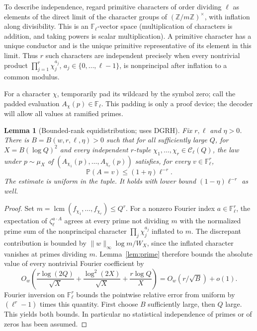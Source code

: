 \documentclass[11pt]{article}
\newtheorem{lemma}[theorem]{Lemma}
\theoremstyle{remark}\newtheorem{remark}[theorem]{Remark}
\newcommand{\F}{\mathbb F}
\newcommand{\Pp}{\mathbb P}
\newcommand{\C}{\mathcal C}
\begin{document}
To describe independence, regard primitive characters of order dividing $\ell$ as elements of the direct limit of the character groups of $(\mathbb Z/m\mathbb Z)^\times$, with inflation along divisibility. This is an $\F_\ell$-vector space (multiplication of characters is addition, and taking powers is scalar multiplication). A primitive character has a unique conductor and is the unique primitive representative of its element in this limit. Thus $r$ such characters are independent precisely when every nontrivial product $\prod_{j=1}^r\chi_j^{a_j}$, $a_j\in\{0,\dots,\ell-1\}$, is nonprincipal after inflation to a common modulus.

For a character $\chi$, temporarily pad its wildcard by the symbol zero; call the padded evaluation $A_\chi(p)\in\F_\ell$. This padding is only a proof device; the decoder will allow all values at ramified primes.

\begin{lemma}[Bounded-rank equidistribution; uses DGRH]\label{lem:rank}
Fix $r,\ell$ and $\eta>0$. There is $B=B(w,r,\ell,\eta)>0$ such that for all sufficiently large $Q$, for $X=B(\log Q)^2$ and every independent $r$-tuple $\chi_1,\dots,\chi_r\in\C_\ell(Q)$, the law under $p\sim\mu_X$ of $(A_{\chi_1}(p),\ldots,A_{\chi_r}(p))$ satisfies, for every $v\in\F_\ell^r$,
\begin{equation}\label{eq:pointwise}
 \Pp(A=v)\le (1+\eta)\ell^{-r}.
\end{equation}
The estimate is uniform in the tuple. It holds with lower bound $(1-\eta)\ell^{-r}$ as well.
\end{lemma}
\begin{proof}
Set $m=\operatorname{lcm}(f_{\chi_1},\ldots,f_{\chi_r})\le Q^r$. For a nonzero Fourier index $a\in\F_\ell^r$, the expectation of $\zeta_\ell^{a\cdot A}$ agrees at every prime not dividing $m$ with the normalized prime sum of the nonprincipal character $\prod_j\chi_j^{a_j}$ inflated to $m$. The discrepant contribution is bounded by $\|w\|_\infty\log m/W_X$, since the inflated character vanishes at primes dividing $m$. Lemma~\ref{lem:prime} therefore bounds the absolute value of every nontrivial Fourier coefficient by
\[
 O_w\left(\frac{r\log(2Q)}{\sqrt X}+\frac{\log^2(2X)}{\sqrt X}+\frac{r\log Q}{X}\right)
 =O_w(r/\sqrt B)+o(1).
\]
Fourier inversion on $\F_\ell^r$ bounds the pointwise relative error from uniform by $(\ell^r-1)$ times this quantity. First choose $B$ sufficiently large, then $Q$ large. This yields both bounds. In particular no statistical independence of primes or of zeros has been assumed.
\end{proof}
\end{document}
